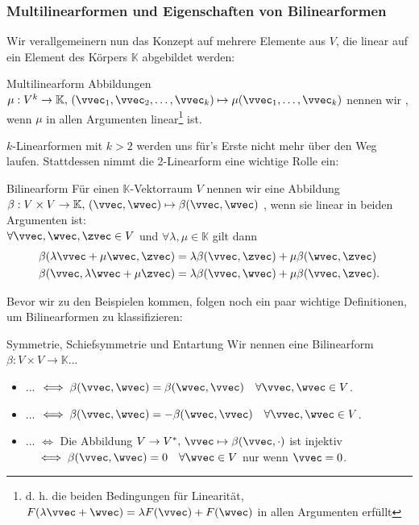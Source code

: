 \subsubsection{Multilinearformen und Eigenschaften von Bilinearformen}
Wir verallgemeinern nun das Konzept auf mehrere Elemente aus $V$, die linear auf ein Element des Körpers $\mathbb{K}$ abgebildet werden:
\begin{Def}
{Multilinearform}
Abbildungen $\mu: V^k\to\mathbb{K},\,(\vvec_1,\vvec_2,\ldots,\vvec_k)\mapsto\mu(\vvec_1,\ldots,\vvec_k)$ nennen wir , wenn $\mu$ in allen Argumenten linear\footnote{d. h. die beiden Bedingungen für Linearität, $F(\lambda \vvec+\wvec)=\lambda F(\vvec)+F(\wvec)$ in allen Argumenten erfüllt} ist.
\end{Def}
$k$-Linearformen mit $k>2$ werden uns für's Erste nicht mehr über den Weg laufen. Stattdessen nimmt die 2-Linearform eine wichtige Rolle ein:
\begin{Def}
{Bilinearform}
Für einen $\mathbb{K}$-Vektorraum $V$ nennen wir eine Abbildung\\
$\beta: V\times V\to \mathbb{K},\, (\vvec,\wvec)\mapsto\beta(\vvec,\wvec)$ , wenn sie linear in beiden Argumenten ist:\\
$\forall \vvec,\wvec,\zvec\in V$ und $\forall \lambda, \mu\in\mathbb{K}$ gilt dann
\begin{align*}
    &\beta(\lambda \vvec+\mu \wvec,\zvec)=\lambda\beta(\vvec,\zvec)+\mu \beta(\wvec,\zvec)\\
    &\beta(\vvec, \lambda \wvec+\mu \zvec)=\lambda\beta(\vvec,\wvec)+\mu\beta(\vvec,\zvec).
\end{align*}
\end{Def}
Bevor wir zu den Beispielen kommen, folgen noch ein paar wichtige Definitionen, um Bilinearformen zu klassifizieren:
\begin{Def}
{Symmetrie{,} Schiefsymmetrie und Entartung}
Wir nennen eine Bilinearform $\beta:V\times V\to \mathbb{K}$...
\begin{itemize}
    \item ... $\iff\beta(\vvec,\wvec)=\beta(\wvec,\vvec)\quad\forall \vvec,\wvec\in V$.
    \item ... $\iff\beta(\vvec,\wvec)=-\beta(\wvec,\vvec)\quad\forall \vvec,\wvec\in V$.
    \item ... $\iff$ Die Abbildung $V\to V^*,\,\vvec\mapsto \beta(\vvec,\cdot)$ ist injektiv\\
    $\quad\iff\beta(\vvec,\wvec)=0\quad\forall \wvec\in V$ nur wenn $\vvec=0$.
\end{itemize}
\end{Def}

